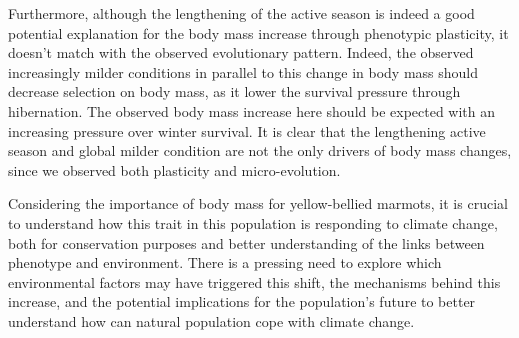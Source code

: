 \documentclass[
  12pt,
  letterpaper,
]{scrartcl}
\begin{document}
Furthermore, although the lengthening of the active season is indeed a
good potential explanation for the body mass increase through phenotypic
plasticity, it doesn't match with the observed evolutionary pattern.
Indeed, the observed increasingly milder conditions in parallel to this
change in body mass should decrease selection on body mass, as it lower
the survival pressure through hibernation. The observed body mass
increase here should be expected with an increasing pressure over winter
survival. It is clear that the lengthening active season and global
milder condition are not the only drivers of body mass changes, since we
observed both plasticity and micro-evolution.

Considering the importance of body mass for yellow-bellied marmots, it
is crucial to understand how this trait in this population is responding
to climate change, both for conservation purposes and better
understanding of the links between phenotype and environment. There is a
pressing need to explore which environmental factors may have triggered
this shift, the mechanisms behind this increase, and the potential
implications for the population's future to better understand how can
natural population cope with climate change.
\end{document}
